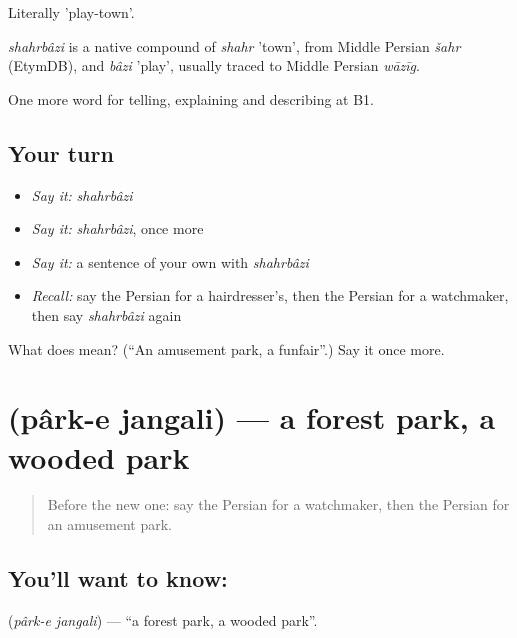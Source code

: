 Literally 'play-town'.

\begin{cousinweb}
\emph{shahrbâzi} is a native compound of \emph{shahr} 'town', from Middle Persian \emph{šahr} (EtymDB), and \emph{bâzi} 'play', usually traced to Middle Persian \emph{wāzīg}.
\end{cousinweb}

\begin{grammarlens}[title={What you've built}]
One more word for telling, explaining and describing at B1.
\end{grammarlens}

\subsection*{Your turn}
\begin{itemize}
\raggedright
  \item \emph{Say it:} \emph{shahrbâzi}
  \item \emph{Say it:} \emph{shahrbâzi}, once more
  \item \emph{Say it:} a sentence of your own with \emph{shahrbâzi}
  \item \emph{Recall:} say the Persian for a hairdresser's, then the Persian for a watchmaker, then say \emph{shahrbâzi} again
\end{itemize}

\begin{tcolorbox}[breakable,colback=teal!4,colframe=teal!35!black,title={Before you move on}]
What does  mean? (\textquotedblleft{}An amusement park, a funfair\textquotedblright{}.) Say it once more.
\end{tcolorbox}
\section[\texorpdfstring{\fa{پارک} \fa{جنگلی} (pârk-e jangali)}{پارک جنگلی (pârk-e jangali)}]{  (pârk-e jangali) — a forest park, a wooded park}

\label{lesson:FA-C455-park-e-jangali}



\begin{quote}
Before the new one: say the Persian for a watchmaker, then the Persian for an amusement park.
\end{quote}

\subsection*{You'll want to know:  }
\textbf{ } (\emph{pârk-e jangali}) — \textquotedblleft{}a forest park, a wooded park\textquotedblright{}.

